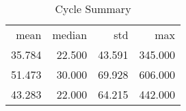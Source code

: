 \begin{table}[ht]
\centering
\caption{Cycle Summary} 
\begin{tabular}{rrrr}
 mean & median & std & max \\ 
 35.784 & 22.500 & 43.591 & 345.000 \\ 
   \hline
51.473 & 30.000 & 69.928 & 606.000 \\ 
  43.283 & 22.000 & 64.215 & 442.000 \\ 
  \end{tabular}
  \label{tab:sumcycles}
\end{table}
